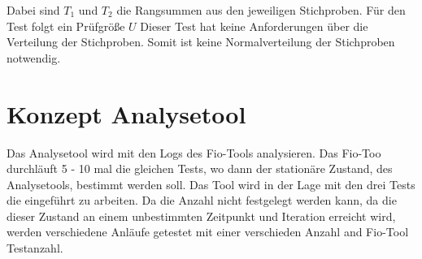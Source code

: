Dabei sind $T_1$ und $T_2$ die Rangsummen aus den jeweiligen Stichproben.
Für den Test folgt ein Prüfgröße $U$  
Dieser Test
hat keine Anforderungen über die Verteilung der Stichproben.
Somit ist keine Normalverteilung der Stichproben notwendig.


\section{Konzept Analysetool}
Das Analysetool wird mit den Logs des Fio-Tools analysieren.
Das Fio-Too durchläuft 5 - 10 mal die gleichen Tests, wo dann der stationäre Zustand, des Analysetools,
bestimmt werden soll. Das Tool wird in der Lage mit den drei Tests die eingeführt zu arbeiten.
Da die Anzahl nicht festgelegt werden kann, da die dieser Zustand an einem unbestimmten Zeitpunkt und Iteration erreicht wird,
werden verschiedene Anläufe getestet mit einer verschieden Anzahl and Fio-Tool Testanzahl.

